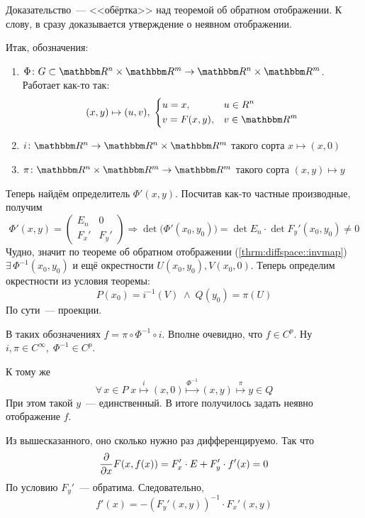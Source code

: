 \documentclass[12pt,timbord]{../../../notes}
\begin{document}
\begin{ittproof}
  Доказательство~--- <<обёртка>> над теоремой об обратном отображении. 
  К слову, в \cite[c.~673]{zorich1} сразу доказывается утверждение о неявном отображении.

  Итак, обозначения:
  \begin{enumerate}
    \item $\Phi\colon G \subset \R^n\times\R^m \to \R^n\times\R^m$. Работает как-то так:
      \[
        (x, y) \mapsto (u, v) , \;
        \begin{dcases}
          u = x, & u \in R^n \\
          v = F(x,y) , & v\in \R^m
        \end{dcases}
      \]
    \item $i\colon \R^n \to \R^n \times \R^m$ такого сорта $x \mapsto (x, 0)$
    \item $\pi \colon \R^n \times \R^m \to \R^m$ такого сорта $(x,y) \mapsto y$
  \end{enumerate}

  Теперь найдём определитель $\Phi'(x,y)$. Посчитав как-то частные производные, получим
  \[
    \Phi'(x,y) = 
    \left(
      \begin{array}{c|c}
        E_n    & 0 \\
        \hline
        F_x'   &  F_y'
      \end{array}
    \right) \Rightarrow \det \bigl(\Phi'(x_0,y_0) \bigr) = \det E_n \cdot \det F_y'(x_0, y_0) \neq 0
  \]
  Чудно, значит по теореме об обратном отображении (\ref{thrm:diffspace::invmap}) 
  $\exists\, \Phi^{-1}(x_0, y_0)$ и ещё окрестности $U(x_0, y_0), V(x_0, 0)$.
  Теперь определим окрестности из условия теоремы:
  \[
    P(x_0) = i^{-1}(V) \; \land \; Q(y_0) = \pi(U)
  \]
  По сути~--- проекции.
  
  В таких обозначениях $f = \pi \circ \Phi^{-1} \circ i$. Вполне очевидно, что $f \in C^p$.
  Ну $i, \pi \in C^\infty, \; \Phi^{-1} \in C^p$. 

  К тому же
  \[
    \forall\, x \in P \; x \overset{i}{\mapsto} (x, 0) \overset{\Phi^{-1}}{\mapsto} (x,y) 
    \overset{\pi}{\mapsto} y \in Q 
  \]
  При этом такой $y$~--- единственный. В итоге получилось задать неявно отображение $f$.

  Из вышесказанного, оно сколько нужно раз дифференцируемо. Так что
  \[
    \frac{\partial }{\partial x} F(x, f(x)) = F_x' \cdot E + F_y' \cdot f'(x) = 0
  \]
  По условию $F_y'$~--- обратима. Следовательно,
  \[
    f'(x) = - (F_y'(x,y))^{-1} \cdot F_x'(x,y)
  \]
  
\end{ittproof}
\end{document}
